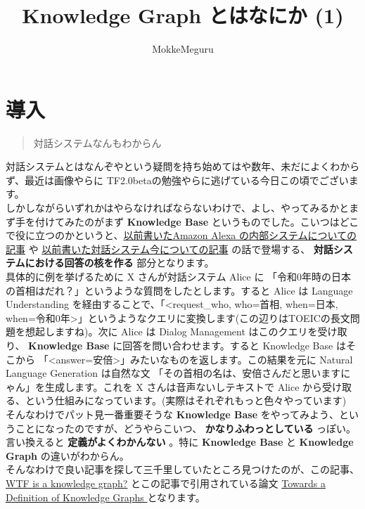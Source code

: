 \documentclass[a4paper, dvipdfmx, 10pt]{article}
\author{MokkeMeguru}
\date{}
\title{Knowledge Graph とはなにか (1)}
\begin{document}
\maketitle
\section{導入}
\label{sec:org12aa143}
\begin{quote}
対話システムなんもわからん\\
\end{quote}

対話システムとはなんぞやという疑問を持ち始めてはや数年、未だによくわからず、最近は画像やらに TF2.0betaの勉強やらに逃げている今日この頃でございます。\\

しかしながらいずれかはやらなければならないわけで、よし、やってみるかとまず手を付けてみたのがまず \textbf{Knowledge Base} というものでした。こいつはどこで役に立つのかというと、\href{https://qiita.com/MeguruMokke/items/83b3d921729b62ae8ee2}{以前書いたAmazon Alexa の内部システムについての記事} や \href{https://qiita.com/MeguruMokke/items/6e5d7997f4df7f08030d}{以前書いた対話システム今についての記事} の話で登場する、 \textbf{対話システムにおける回答の核を作る} 部分となります。\\

具体的に例を挙げるために X さんが対話システム Alice に 「令和0年時の日本の首相はだれ？」というような質問をしたとします。すると Alice は Language Understanding を経由することで、「<request\_who, who=首相, when=日本, when=令和0年>」というようなクエリに変換します(この辺りはTOEICの長文問題を想起しますね)。次に Alice は Dialog Management はこのクエリを受け取り、 \textbf{Knowledge Base} に回答を問い合わせます。すると Knowledge Base はそこから 「<answer=安倍>」みたいなものを返します。この結果を元に Natural Language Generation は自然な文 「その首相の名は、安倍さんだと思いますにゃん」を生成します。これを X さんは音声ないしテキストで Alice から受け取る、という仕組みになっています。(実際はそれぞれもっと色々やっています)\\

そんなわけでパット見一番重要そうな \textbf{Knowledge Base} をやってみよう、ということになったのですが、どうやらこいつ、 \textbf{かなりふわっとしている} っぽい。言い換えると \textbf{定義がよくわかんない} 。特に \textbf{Knowledge Base} と \textbf{Knowledge Graph} の違いがわからん。\\

そんなわけで良い記事を探して三千里していたところ見つけたのが、この記事、\href{https://hackernoon.com/wtf-is-a-knowledge-graph-a16603a1a25f}{WTF is a knowledge graph?} とこの記事で引用されている論文 \href{http://ceur-ws.org/Vol-1695/paper4.pdf}{Towards a Definition of Knowledge Graphs } となります。\\
\end{document}
